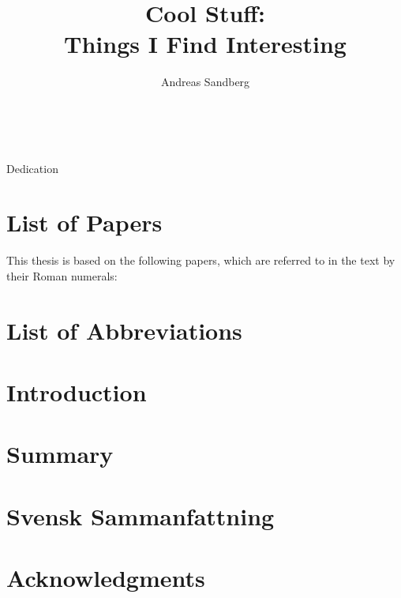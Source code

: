 \documentclass{uuthesis}
\title{Cool Stuff:\texorpdfstring{\\}{ }
  Things I Find Interesting}%
\author{Andreas Sandberg}
\begin{document}
\frontmatter
\begin{placeholderpage}
  {\noindent\HUGE\sffamily \thetitle}\bigskip\\
  {\noindent\LARGE\sffamily \theauthor}
\end{placeholderpage}

\begin{placeholderpage}
  \begin{abstract}
    \lipsum[1-2]
  \end{abstract}
\end{placeholderpage}

\begin{dedication}
  Dedication
\end{dedication}

\cleartorecto

\chapter*{List of Papers}
This thesis is based on the following papers, which are referred to in
the text by their Roman numerals:
\begin{paperlist}
\end{paperlist}
\clearpage

\tableofcontents*

\chapter{List of Abbreviations}
\lipsum[3-4]

\mainmatter
\chapter{Introduction}
\lipsum[5-6]

\chapter{Summary}

\chapter{Svensk Sammanfattning}
\lipsum[5-6]

\chapter{Acknowledgments}
\lipsum[5-6]
\end{document}
